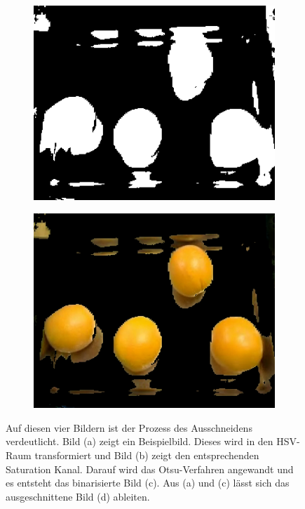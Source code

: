 \documentclass[a4,german]{article}
\begin{document}
\begin{figure}[b]
\begin{subfigure}[c]{0.245\textwidth}
\end{subfigure}
\begin{subfigure}[c]{0.245\textwidth}
\includegraphics[width=1\textwidth]{TestMask.png}
\end{subfigure}
\begin{subfigure}[c]{0.245\textwidth}
\includegraphics[width=1\textwidth]{TestAusgeschnitten.png}
\end{subfigure}
\caption{Auf diesen vier Bildern ist der Prozess des Ausschneidens verdeutlicht. Bild (a) zeigt ein Beispielbild. Dieses wird in den HSV-Raum transformiert und Bild (b) zeigt den entsprechenden Saturation Kanal. Darauf wird das Otsu-Verfahren angewandt und es entsteht das binarisierte Bild (c). Aus (a) und (c) lässt sich das ausgeschnittene Bild (d) ableiten.}
\end{figure}
\end{document}
